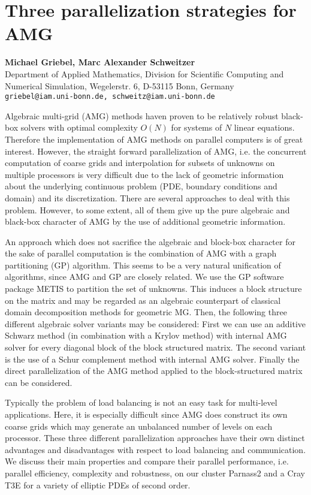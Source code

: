 \documentclass[11pt]{article}
\newcommand{\nextab}[4]{
	\section{#2}
	{\bf #1} \\ \nopagebreak
	{#3} \\ \nopagebreak
	{\tt #4} \nopagebreak
	}
\begin{document}

\nextab{Michael Griebel, Marc Alexander Schweitzer}
	{Three parallelization strategies for AMG}
	{Department of Applied Mathematics,
	Division for Scientific Computing and Numerical Simulation,
	Wegelerstr. 6, D-53115 Bonn, Germany}
	{griebel@iam.uni-bonn.de, schweitz@iam.uni-bonn.de}

Algebraic multi-grid (AMG) methods haven proven to be relatively robust black-box solvers with optimal
complexity $O(N)$ for systems of $N$ linear equations.
Therefore the implementation of AMG methods on parallel computers
is of great interest. However, the straight forward parallelization of AMG,
i.e. the concurrent computation of coarse grids and interpolation for subsets of unknowns
on multiple processors is very difficult due to the lack of geometric information
about the underlying continuous problem (PDE, boundary conditions and domain) and its discretization.
There are several approaches to deal with this problem. However, to some extent, all of them give up
the pure algebraic and black-box character of AMG by the use of additional geometric information.

An approach which does not sacrifice the algebraic and block-box character for the sake of
parallel computation is the combination of AMG with a graph partitioning (GP) algorithm.
This seems to be a very natural unification of algorithms, since AMG and GP are
closely related.
We use the GP software package METIS to partition
the set of unknowns. This induces a block structure on the matrix and may be regarded
as an algebraic counterpart of classical domain decomposition methods for geometric MG.
Then, the following three different algebraic solver variants may be considered:
First we can use an additive Schwarz method (in combination with a Krylov method)
with internal AMG solver for every diagonal block of the block structured matrix.
The second variant is the use of a Schur complement method with internal AMG solver.
Finally the direct parallelization of the AMG method applied to
the block-structured matrix can be considered.

Typically the problem of load balancing is not an easy task for multi-level
applications. Here, it is especially difficult since AMG does construct its
own coarse grids which may generate an unbalanced number of levels on each processor.
These three different parallelization approaches have their own distinct advantages and
disadvantages with respect to load balancing and communication.
We discuss their main properties and compare their parallel performance,
i.e. parallel efficiency, complexity and robustness, on our cluster
Parnass2 and a Cray T3E for a variety of elliptic PDEs of second order.
\end{document}
